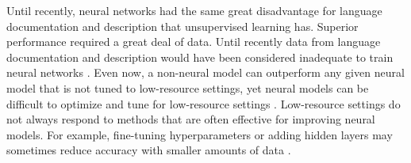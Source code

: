 
Until recently, neural networks had the same great disadvantage for language documentation and description that unsupervised learning has. Superior performance required a great deal of data. Until recently data from language documentation and description would have been considered inadequate to train neural networks \citep{duong_natural_2017}.
Even now, a non-neural model can outperform any given neural model that is not tuned to low-resource settings, yet neural models can be difficult to optimize and tune for low-resource settings \citep{popel_training_2018}.
Low-resource settings do not always respond to methods that are often effective for improving neural models. For example, fine-tuning hyperparameters or adding hidden layers may sometimes reduce accuracy with smaller amounts of data \citep{cotterell_conll-sigmorphon_2017,popel_training_2018}. 

